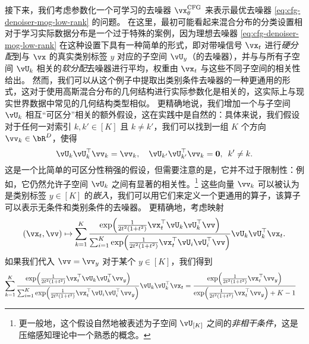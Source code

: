 \documentclass[../../book-main.tex]{subfiles}
\begin{document}
\begin{example}
  接下来，我们考虑参数化一个可学习的去噪器 $\vx_{\theta}^{\mathrm{CFG}}$ 来表示最优去噪器 \eqref{eq:cfg-denoiser-mog-low-rank} 的问题。
  在这里，最初可能看起来混合分布的分类设置相对于学习实际数据分布是一个过于特殊的案例，因为理想去噪器 \eqref{eq:cfg-denoiser-mog-low-rank} 在这种设置下具有一种简单的形式，即对带噪信号 $\vx_t$ 进行\textit{硬分配}到与 $\vx$ 的真实类别标签 $y$ 对应的子空间 $\vU_y$（的去噪器），并与与所有子空间 $\vU_k$ 相关的\textit{软分配}去噪器进行平均，权重由 $\vx_t$ 与这些不同子空间的相关性给出。
  然而，我们可以从这个例子中提取出类别条件去噪器的一种更通用的形式，这对于使用高斯混合分布的几何结构进行实际参数化是相关的，这实际上与现实世界数据中常见的几何结构类型相似。
  更精确地说，我们增加一个与子空间 $\vU_k$ 相互“可区分”相关的额外假设，这在实践中是自然的：具体来说，我们假设对于任何一对索引 $k, k' \in [K]$ 且 $k \neq k'$，我们可以找到一组 $K$ 个方向 $\vv_{k} \in \bR^D$，使得
  \begin{equation}
    \vU_{k}\vU_{k}^\top \vv_k = \vv_k, \quad
    \vU_{k'}\vU_{k'}^\top \vv_k = \Zero, \enspace k' \neq k.
  \end{equation}
  这是一个比简单的可区分性稍强的假设，但需要注意的是，它并不过于限制性：例如，它仍然允许子空间 $\vU_{k}$ 之间有显著的相关性。\footnote{ 更一般地，这个假设自然地被表述为子空间 $\vU_{[K]}$ 之间的\textit{非相干条件}，这是压缩感知理论中一个熟悉的概念。}
  这些向量 $\vv_k$ 可以被认为是类别标签 $y \in [K]$ 的\textit{嵌入}，我们可以用它们来定义一个更通用的算子，该算子可以表示无条件和类别条件的去噪器。
  更精确地，考虑映射
  \begin{equation}\label{eq:mog-conditional-denoising-unified-operator}
    (\vx_t, \vv) \mapsto
    \sum_{k = 1}^{K}\frac{
      \exp\rp{\frac{1}{2t^{2}(1
      + t^{2})}\vx_t^\top \vU_k \vU_k^\top \vv}
    }
    {
      \sum_{i
      = 1}^{K}\exp\rp{\frac{1}{2t^{2}(1
      + t^{2})}\vx_t^\top \vU_i \vU_i^\top \vv}
    }
    \vU_{k}\vU_{k}^{\top}\vx_t.
  \end{equation}
  如果我们代入 $\vv = \vv_y$ 对于某个 $y \in [K]$，我们得到
  \begin{align}
    \begin{split}
    \sum_{k = 1}^{K}
    \frac{
      \exp\rp{\frac{1}{2t^{2}(1
      + t^{2})}\vx_t^\top \vU_k \vU_k^\top \vv_y}
    }
    {
      \sum_{i
      = 1}^{K}\exp\rp{\frac{1}{2t^{2}(1
      + t^{2})}\vx_t^\top \vU_i \vU_i^\top \vv_y}
    }
    \vU_{k}\vU_{k}^{\top}\vx_t
    &=
    \frac{
      \exp\rp{\frac{1}{2t^{2}(1
      + t^{2})}\vx_t^\top \vv_y}
    }
    {
      \exp\rp{\frac{1}{2t^{2}(1
      + t^{2})}\vx_t^\top \vv_y}
      + K-1
}
\end{split}
\end{align}
\end{example}
\end{document}
